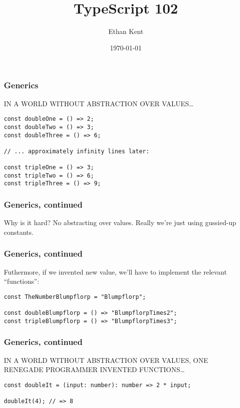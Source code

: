 \documentclass{beamer}
\title{TypeScript 102}
\author{Ethan Kent}
\institute{Spoonflower}
\date{\today}
\begin{document}
\frame{\titlepage}

\begin{frame}[fragile]
  \frametitle{Generics}

  IN A WORLD WITHOUT ABSTRACTION OVER VALUES\ldots \\

  \begin{verbatim}
const doubleOne = () => 2;
const doubleTwo = () => 3;
const doubleThree = () => 6;

// ... approximately infinity lines later:

const tripleOne = () => 3;
const tripleTwo = () => 6;
const tripleThree = () => 9;
  \end{verbatim}
\end{frame}

\begin{frame}
  \frametitle{Generics, continued}

  Why is it hard? No abstracting over values. Really we're just using
  gussied-up constants.

\end{frame}

\begin{frame}[fragile]
  \frametitle{Generics, continued}
  Futhermore, if we invented new value, we'll have to implement the relevant
  ``functions'': \\

  \begin{verbatim}
const TheNumberBlumpflorp = "Blumpflorp";

const doubleBlumpflorp = () => "BlumpflorpTimes2";
const tripleBlumpflorp = () => "BlumpflorpTimes3";
  \end{verbatim}
\end{frame}

\begin{frame}[fragile]
  \frametitle{Generics, continued}

  IN A WORLD WITHOUT ABSTRACTION OVER VALUES, ONE RENEGADE PROGRAMMER
  INVENTED FUNCTIONS\ldots \\

  \begin{verbatim}
const doubleIt = (input: number): number => 2 * input;

doubleIt(4); // => 8
  \end{verbatim}
\end{frame}
\end{document}
